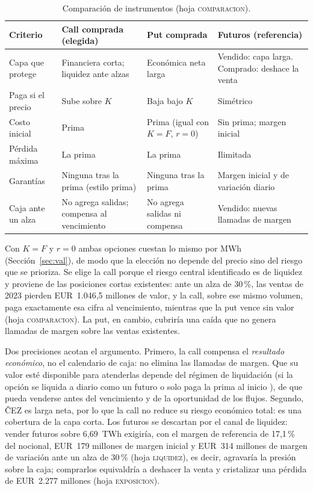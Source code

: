 \documentclass[11pt,letterpaper]{article}
\theoremstyle{plain}
\theoremstyle{definition}
\theoremstyle{remark}
\numberwithin{equation}{section}
\newcommand{\pc}{\mbox{\,\%}}
\begin{document}
\begin{table}[H]
    \centering\small
    \caption{Comparación de instrumentos (hoja \textsc{comparacion}).}\label{tab:comp}
    \begin{tabular}{@{}p{2.7cm}p{4.1cm}p{4.1cm}p{4.2cm}@{}}
        \toprule
            Criterio & Call comprada (elegida) & Put comprada & Futuros (referencia)\\
        \midrule
            Capa que protege & Financiera corta; liquidez ante alzas & Económica neta larga & Vendido: capa larga. Comprado: deshace la venta\\
            Paga si el precio & Sube sobre $K$ & Baja bajo $K$ & Simétrico\\
            Costo inicial & Prima & Prima (igual con $K=F$, $r=0$) & Sin prima; margen inicial\\
            Pérdida máxima & La prima & La prima & Ilimitada\\
            Garantías & Ninguna tras la prima (estilo prima) & Ninguna tras la prima & Margen inicial y de variación diario\\
            Caja ante un alza & No agrega salidas; compensa al vencimiento & No agrega salidas ni compensa & Vendido: nuevas llamadas de margen\\
        \bottomrule
    \end{tabular}
\end{table}

Con $K=F$ y $r=0$ ambas opciones cuestan lo mismo por MWh (Sección~\ref{sec:val}), de modo que la elección no depende del precio sino del riesgo que se prioriza. Se elige la call porque el riesgo central identificado es de liquidez y proviene de las posiciones cortas existentes: ante un alza de 30\pc{}, las ventas de 2023 pierden EUR~1.046,5 millones de valor, y la call, sobre ese mismo volumen, paga exactamente esa cifra al vencimiento, mientras que la put vence sin valor (hoja \textsc{comparacion}). La put, en cambio, cubriría una caída que no genera llamadas de margen sobre las ventas existentes.

Dos precisiones acotan el argumento. Primero, la call compensa el \emph{resultado económico}, no el calendario de caja: no elimina las llamadas de margen. Que su valor esté disponible para atenderlas depende del régimen de liquidación (si la opción se liquida a diario como un futuro o solo paga la prima al inicio \cite{eccm,ecc46}), de que pueda venderse antes del vencimiento y de la oportunidad de los flujos. Segundo, ČEZ es larga neta, por lo que la call no reduce su riesgo económico total: es una cobertura de la capa corta. Los futuros se descartan por el canal de liquidez: vender futuros sobre 6,69~TWh exigiría, con el margen de referencia de 17,1\pc{} del nocional, EUR~179 millones de margen inicial y EUR~314 millones de margen de variación ante un alza de 30\pc{} (hoja \textsc{liquidez}), es decir, agravaría la presión sobre la caja; comprarlos equivaldría a deshacer la venta y cristalizar una pérdida de EUR~2.277 millones (hoja \textsc{exposicion}).
\end{document}
